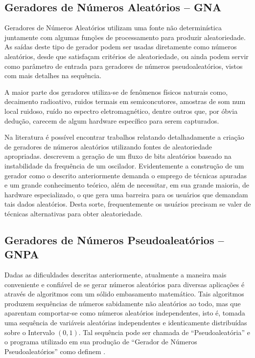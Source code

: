 \subsection{Geradores de Números Aleatórios -- GNA}
  
Geradores de Números Aleatórios utilizam uma fonte não determinística juntamente com algumas funções de processamento para produzir aleatoriedade. 
As saídas deste tipo de gerador podem ser usadas diretamente como números aleatórios, desde que satisfaçam critérios de aleatoriedade, ou ainda podem servir como parâmetro de entrada para geradores de números pseudoaleatórios, vistos com mais detalhes na sequência. 

A maior parte dos geradores utiliza-se de fenômenos físicos naturais como, decaimento radioativo, ruidos termais em semiconcutores, amostras de som num local ruidoso, ruído no espectro eletromagnético, dentre outros que, por óbvia dedução, carecem de algum hardware específico para serem capturados. 

Na literatura é possível encontrar trabalhos relatando detalhadamente a criação de geradores de números aleatórios utilizando fontes de aleatoriedade apropriadas.
\citet{Fairfield:85} descrevem a geração de um fluxo de bits aleatórios baseado na instabilidade da frequência de um oscilador.
Evidentemente a construção de um gerador como o descrito anteriormente demanda o emprego de técnicas apuradas e um grande conhecimento teórico, além de necessitar, em sua grande maioria, de hardware especializado, o que gera uma barreira para os usuários que demandam tais dados aleatórios.
Desta sorte, frequentemente os usuários precisam se valer de técnicas alternativas para obter aleatoriedade.

\subsection{Geradores de Números Pseudoaleatórios -- GNPA}

Dadas as dificuldades descritas anteriormente, atualmente a maneira mais conveniente e confiável de se gerar números aleatórios para diversas aplicações é através de algoritmos com um sólido embasamento matemático. 
Tais algoritmos produzem sequências de números sabidamente não aleatórios ao todo, mas que aparentam comportar-se como números aleatórios independentes, isto é, tomada uma sequência de variáveis aleatórias independentes e identicamente distribuídas sobre o Intervalo $(0,1)$. 
Tal sequência pode ser chamada de ``Pseudoaleatória'' e o programa utilizado em sua produção de ``Gerador de Números Pseudoaleatórios'' como definem \citet{LEcuyer:98}.

